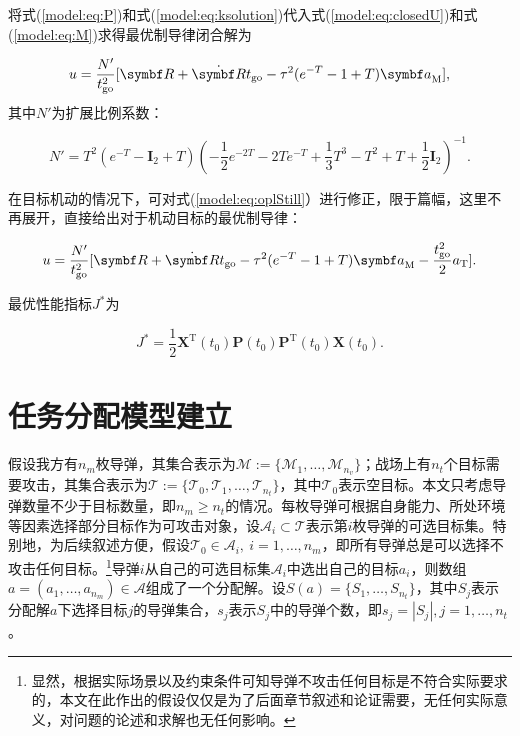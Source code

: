 将式(\ref{model:eq:P})和式(\ref{model:eq:ksolution})代入式(\ref{model:eq:closedU})和式(\ref{model:eq:M})求得最优制导律闭合解为

\begin{equation}
\label{model:eq:oplStill}
	u = \frac{N'}{t_{\text{go}}^2} [ \bm R+\dot{\bm R}t_{\text{go}} - \tau^2(e^{-T}-1+T) {\bm a}_{\text M}],
\end{equation}
其中$N'$为扩展比例系数：

\begin{equation}
\label{model:eq:oplparameters}
	N' = T^2 (e^{-T}-{\bm I}_2+T) (-\frac{1}{2}e^{-2T} - 2Te^{-T} + \frac{1}{3}T^3 - T^2 + T + \frac{1}{2}{\bm I}_2)^{-1}.
\end{equation}

在目标机动的情况下，可对式(\ref{model:eq:oplStill}）进行修正，限于篇幅，这里不再展开，直接给出对于机动目标的最优制导律：

\begin{equation}
\label{model:eq:oplMove}
	u = \frac{N'}{t_{\text{go}}^2} [ \bm R+\dot{\bm R}t_{\text{go}} - \tau^2(e^{-T}-1+T) {\bm a}_{\text M}-\frac{t_{\text{go}}^2}{2}a_{\text T}].
\end{equation}

最优性能指标$J^*$为

\begin{equation}
\label{model:eq:Jstar}
	J^* = \frac{1}{2} {\bm X}^{\mathrm T}(t_0) {\bm P}(t_0) {\bm P}^{\mathrm T}(t_0) {\bm X}(t_0).
\end{equation}

\section{任务分配模型建立}
\label{model:sec:assignment}

假设我方有$n_m$枚导弹，其集合表示为$\mathcal{M} := \{\mathcal{M}_1,\dots,\mathcal{M}_{n_v}\}$；战场上有$n_t$个目标需要攻击，其集合表示为$\mathcal{T} := \{\mathcal{T}_0,\mathcal{T}_1,\dots,\mathcal{T}_{n_t}\}$，其中$\mathcal{T}_0$表示空目标。本文只考虑导弹数量不少于目标数量，即$n_m \geq n_t$的情况。每枚导弹可根据自身能力、所处环境等因素选择部分目标作为可攻击对象，设$\mathcal{A}_i \subset \mathcal{T}$表示第$i$枚导弹的可选目标集。特别地，为后续叙述方便，假设$\mathcal{T}_0 \in \mathcal{A}_i,\ i=1,\dots,n_m$，即所有导弹总是可以选择不攻击任何目标。\footnote{显然，根据实际场景以及约束条件可知导弹不攻击任何目标是不符合实际要求的，本文在此作出的假设仅仅是为了后面章节叙述和论证需要，无任何实际意义，对问题的论述和求解也无任何影响。}导弹$i$从自己的可选目标集$\mathcal{A}_i$中选出自己的目标$a_i$，则数组$a=(a_1,\dots,a_{n_m})\in \mathcal{A}$组成了一个分配解。设$S(a)=\{S_1,\dots,S_{n_t}\}$，其中$S_j$表示分配解$a$下选择目标$j$的导弹集合，$s_j$表示$S_j$中的导弹个数，即$s_j = |S_j|, j=1,\dots,n_t$。

